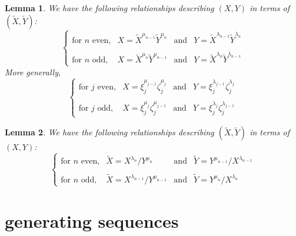 \documentclass[10pt,a4paper]{amsart}
\newtheorem{lem}{Lemma}
\begin{document}
\begin{lem} \label{XY}
We have the following relationships describing $\left(X,Y\right)$ in terms of $\left(\tilde X,\tilde Y\right)$:
\begin{equation*}
\left\{
\begin{array}{llll}
\text{for } n \text{ even,} & X = \tilde X^{\mu_{n-1}} \tilde Y^{\mu_n}  & \text{and} & Y = \tilde X^{\lambda_{n-1}} \tilde Y^{\lambda_n}
\\\\
\text{for } n \text{ odd,} & X = \tilde X^{\mu_n} \tilde Y^{\mu_{n-1}}  & \text{and} & Y= \tilde X^{\lambda_n} \tilde Y^{\lambda_{n-1}}
\end{array}
\right.
\end{equation*}
More generally,
\begin{equation*}
\left\{
\begin{array}{llll}
\text{for } j \text{ even,} & X = \xi_j^{\mu_{j-1}} \zeta_j^{\mu_j}  & \text{and} & Y = \xi_j^{\lambda_{j-1}} \zeta_j^{\lambda_j}
\\\\
\text{for } j \text{ odd,} & X = \xi_j^{\mu_j} \zeta_j^{\mu_{j-1}}  & \text{and} & Y= \xi_j^{\lambda_j} \zeta_j^{\lambda_{j-1}}
\end{array}
\right.
\end{equation*}
\end{lem}

\begin{lem} \label{XYtilde}
We have the following relationships describing $\left(\tilde X,\tilde Y\right)$ in terms of $\left(X,Y\right)$:
\begin{equation*}
\left\{
\begin{array}{llll}
\text{for } n \text{ even,} & \tilde X = X^{\lambda_n}/Y^{\mu_n} & \text{and} & \tilde Y = Y^{\mu_{n-1}}/X^{\lambda_{n-1}}
\\\\
\text{for } n \text{ odd,} & \tilde X = X^{\lambda_{n-1}}/Y^{\mu_{n-1}} & \text{and} & \tilde Y = Y^{\mu_n}/X^{\lambda_n}
\end{array}
\right.
\end{equation*}
\end{lem}

\section{generating sequences} \label{sectgs}
\end{document}
